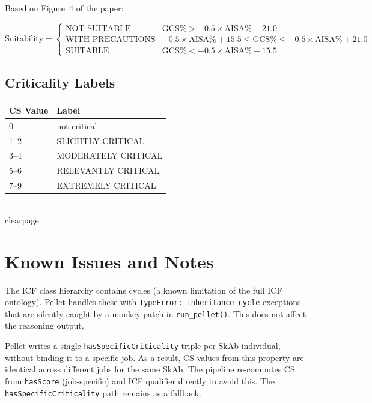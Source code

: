 ﻿\documentclass[12pt,a4paper]{article}
\begin{document}
Based on Figure~4 of the paper:

\begin{equation}
  \text{Suitability} = \begin{cases}
    \text{NOT SUITABLE} & \text{GCS\%} > -0.5 \times \text{AISA\%} + 21.0 \\
    \text{WITH PRECAUTIONS} & -0.5 \times \text{AISA\%} + 15.5 \leq \text{GCS\%} \leq -0.5 \times \text{AISA\%} + 21.0 \\
    \text{SUITABLE} & \text{GCS\%} < -0.5 \times \text{AISA\%} + 15.5
  \end{cases}
\end{equation}

\subsection{Criticality Labels}

\begin{longtable}{@{}ll@{}}
\toprule
\textbf{CS Value} & \textbf{Label} \\
\midrule
\endhead
0 & not critical \\
1--2 & SLIGHTLY CRITICAL \\
3--4 & MODERATELY CRITICAL \\
5--6 & RELEVANTLY CRITICAL \\
7--9 & EXTREMELY CRITICAL \\
\bottomrule
\end{longtable}

\\clearpage
\section{Known Issues and Notes}

\begin{tcolorbox}[colback=noteblue!40, colframe=blue!50!black, title=Note: ICF Inheritance Cycles]
The ICF class hierarchy contains cycles (a known limitation of the full ICF ontology). Pellet handles these with \texttt{TypeError: inheritance cycle} exceptions that are silently caught by a monkey-patch in \texttt{run\_pellet()}. This does not affect the reasoning output.
\end{tcolorbox}

\vspace{0.5em}

\begin{tcolorbox}[colback=warnred!40, colframe=red!60!black, title=Warning: hasSpecificCriticality Is Not Job-Specific]
Pellet writes a single \texttt{hasSpecificCriticality} triple per SkAb individual, without binding it to a specific job. As a result, CS values from this property are identical across different jobs for the same SkAb. The pipeline re-computes CS from \texttt{hasScore} (job-specific) and ICF qualifier directly to avoid this. The \texttt{hasSpecificCriticality} path remains as a fallback.
\end{tcolorbox}
\end{document}
